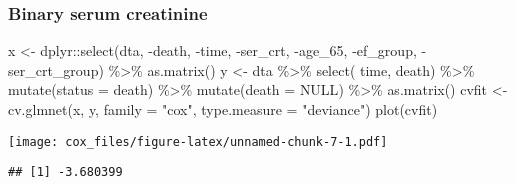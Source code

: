 \documentclass[
]{article}
\newenvironment{Shaded}{\begin{snugshade}}{\end{snugshade}}
\newcommand{\AttributeTok}[1]{\textcolor[rgb]{0.77,0.63,0.00}{#1}}
\newcommand{\ConstantTok}[1]{\textcolor[rgb]{0.00,0.00,0.00}{#1}}
\newcommand{\FunctionTok}[1]{\textcolor[rgb]{0.00,0.00,0.00}{#1}}
\newcommand{\NormalTok}[1]{#1}
\newcommand{\OtherTok}[1]{\textcolor[rgb]{0.56,0.35,0.01}{#1}}
\newcommand{\SpecialCharTok}[1]{\textcolor[rgb]{0.00,0.00,0.00}{#1}}
\newcommand{\StringTok}[1]{\textcolor[rgb]{0.31,0.60,0.02}{#1}}
\begin{document}
\hypertarget{binary-serum-creatinine}{%
\subsubsection{Binary serum creatinine}\label{binary-serum-creatinine}}

\begin{Shaded}
\begin{Highlighting}[]
\NormalTok{x }\OtherTok{\textless{}{-}}\NormalTok{ dplyr}\SpecialCharTok{::}\FunctionTok{select}\NormalTok{(dta, }\SpecialCharTok{{-}}\NormalTok{death, }\SpecialCharTok{{-}}\NormalTok{time, }\SpecialCharTok{{-}}\NormalTok{ser\_crt, }\SpecialCharTok{{-}}\NormalTok{age\_65, }\SpecialCharTok{{-}}\NormalTok{ef\_group, }\SpecialCharTok{{-}}\NormalTok{ser\_crt\_group) }\SpecialCharTok{\%\textgreater{}\%} 
        \FunctionTok{as.matrix}\NormalTok{() }
\NormalTok{y }\OtherTok{\textless{}{-}}\NormalTok{ dta }\SpecialCharTok{\%\textgreater{}\%} \FunctionTok{select}\NormalTok{( time, death) }\SpecialCharTok{\%\textgreater{}\%} \FunctionTok{mutate}\NormalTok{(}\AttributeTok{status =}\NormalTok{ death) }\SpecialCharTok{\%\textgreater{}\%} \FunctionTok{mutate}\NormalTok{(}\AttributeTok{death =} \ConstantTok{NULL}\NormalTok{) }\SpecialCharTok{\%\textgreater{}\%} \FunctionTok{as.matrix}\NormalTok{() }
\NormalTok{cvfit }\OtherTok{\textless{}{-}} \FunctionTok{cv.glmnet}\NormalTok{(x, y, }\AttributeTok{family =} \StringTok{"cox"}\NormalTok{, }\AttributeTok{type.measure =} \StringTok{"deviance"}\NormalTok{)}
\FunctionTok{plot}\NormalTok{(cvfit)}
\end{Highlighting}
\end{Shaded}

\texttt{[image: cox\_files/figure-latex/unnamed-chunk-7-1.pdf]}

\begin{Shaded}
\end{Shaded}

\begin{verbatim}
## [1] -3.680399
\end{verbatim}

\begin{Shaded}
\end{Shaded}
\end{document}
